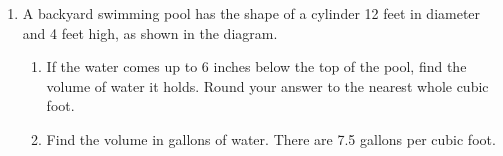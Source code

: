 \documentclass[12pt, twoside]{article}
\begin{document}
\begin{enumerate}
\newpage
  \item A backyard swimming pool has the shape of a cylinder 12 feet in diameter and 4 feet high, as shown in the diagram.
  \begin{enumerate}
    \item If the water comes up to 6 inches below the top of the pool, find the volume of water it holds. Round your answer to the nearest whole cubic foot.
    \begin{flushright}
  \end{flushright}\vspace{2cm}
  \item Find the volume in gallons of water. There are 7.5 gallons per cubic foot.
\end{enumerate}

\end{enumerate}
\end{document}
